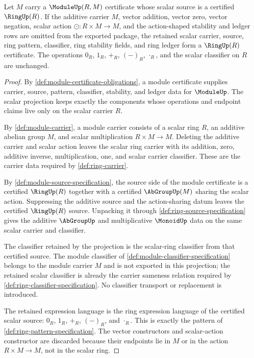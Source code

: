 \begin{proposition}
\label{prop:module-forgets-ring-certificate}
Let $M$ carry a $\ModuleUp(R,M)$ certificate whose scalar source is a certified $\RingUp(R)$. If the additive carrier $M$, vector addition, vector zero, vector negation, scalar action $\odot:R\times M\to M$, and the action-shaped stability and ledger rows are omitted from the exported package, the retained scalar carrier, source, ring pattern, classifier, ring stability fields, and ring ledger form a $\RingUp(R)$ certificate. The operations $0_R$, $1_R$, $+_R$, $(-)_R$, $\cdot_R$, and the scalar classifier on $R$ are unchanged.
\end{proposition}
\begin{proof}
By \autoref{def:module-certificate-obligations}, a module certificate supplies carrier, source, pattern, classifier, stability, and ledger data for $\ModuleUp$. The scalar projection keeps exactly the components whose operations and endpoint claims live only on the scalar carrier $R$.

By \autoref{def:module-carrier}, a module carrier consists of a scalar ring $R$, an additive abelian group $M$, and scalar multiplication $R\times M\to M$. Deleting the additive carrier and scalar action leaves the scalar ring carrier with its addition, zero, additive inverse, multiplication, one, and scalar carrier classifier. These are the carrier data required by \autoref{def:ring-carrier}.

By \autoref{def:module-source-specification}, the source side of the module certificate is a certified $\RingUp(R)$ together with a certified $\AbGroupUp(M)$ sharing the scalar action. Suppressing the additive source and the action-sharing datum leaves the certified $\RingUp(R)$ source. Unpacking it through \autoref{def:ring-source-specification} gives the additive $\AbGroupUp$ and multiplicative $\MonoidUp$ data on the same scalar carrier and classifier.

The classifier retained by the projection is the scalar-ring classifier from that certified source. The module classifier of \autoref{def:module-classifier-specification} belongs to the module carrier $M$ and is not exported in this projection; the retained scalar classifier is already the carrier sameness relation required by \autoref{def:ring-classifier-specification}. No classifier transport or replacement is introduced.

The retained expression language is the ring expression language of the certified scalar source: $0_R$, $1_R$, $+_R$, $(-)_R$, and $\cdot_R$. This is exactly the pattern of \autoref{def:ring-pattern-specification}. The vector constructors and scalar-action constructor are discarded because their endpoints lie in $M$ or in the action $R\times M\to M$, not in the scalar ring.


\end{proof}
